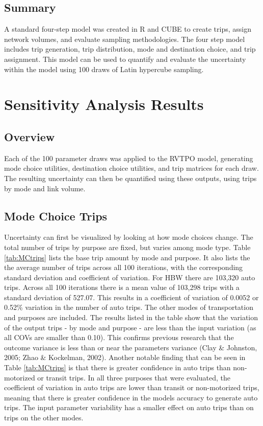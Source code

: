 \documentclass[fancy, masters,twoside]{byuthesis}
\begin{document}
\hypertarget{summary-1}{%
\section{Summary}\label{summary-1}}

A standard four-step model was created in R and CUBE to create trips, assign network volumes, and evaluate sampling methodologies. The four step model includes trip generation, trip distribution, mode and destination choice, and trip assignment. This model can be used to quantify and evaluate the uncertainty within the model using 100 draws of Latin hypercube sampling.

\hypertarget{sensitivity-analysis-results}{%
\chapter{Sensitivity Analysis Results}\label{sensitivity-analysis-results}}

\hypertarget{overview-2}{%
\section{Overview}\label{overview-2}}

Each of the 100 parameter draws was applied to the RVTPO model, generating mode choice utilities, destination choice utilities, and trip matrices for each draw. The resulting uncertainty can then be quantified using these outputs, using trips by mode and link volume.

\hypertarget{mode-choice-trips}{%
\section{Mode Choice Trips}\label{mode-choice-trips}}

Uncertainty can first be visualized by looking at how mode choices change. The total number of trips by purpose are fixed, but varies among mode type. Table \ref{tab:MCtrips} lists the base trip amount by mode and purpose. It also lists the the average number of trips across all 100 iterations, with the corresponding standard deviation and coefficient of variation. For HBW there are 103,320 auto trips. Across all 100 iterations there is a mean value of 103,298 trips with a standard deviation of 527.07. This results in a coefficient of variation of 0.0052 or 0.52\% variation in the number of auto trips. The other modes of transportation and purposes are included. The results listed in the table show that the variation of the output trips - by mode and purpose - are less than the input variation (as all COVs are smaller than 0.10). This confirms previous research that the outcome variance is less than or near the parameters variance (Clay \& Johnston, 2005; Zhao \& Kockelman, 2002). Another notable finding that can be seen in Table \ref{tab:MCtrips} is that there is greater confidence in auto trips than non-motorized or transit trips. In all three purposes that were evaluated, the coefficient of variation in auto trips are lower than transit or non-motorized trips, meaning that there is greater confidence in the models accuracy to generate auto trips. The input parameter variability has a smaller effect on auto trips than on trips on the other modes.
\end{document}
